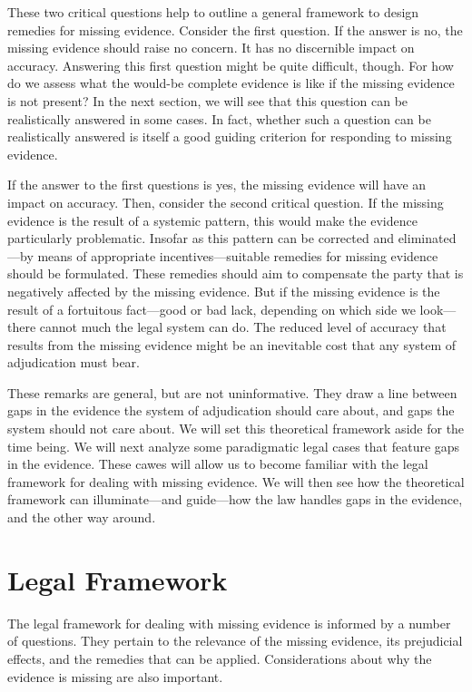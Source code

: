 \documentclass[
  10pt,
  dvipsnames,enabledeprecatedfontcommands]{scrartcl}
\begin{document}
These two critical questions help to outline a general framework to
design remedies for missing evidence. Consider the first question. If
the answer is no, the missing evidence should raise no concern. It has
no discernible impact on accuracy. Answering this first question might
be quite difficult, though. For how do we assess what the would-be
complete evidence is like if the missing evidence is not present? In the
next section, we will see that this question can be realistically
answered in some cases. In fact, whether such a question can be
realistically answered is itself a good guiding criterion for responding
to missing evidence.

If the answer to the first questions is yes, the missing evidence will
have an impact on accuracy. Then, consider the second critical question.
If the missing evidence is the result of a systemic pattern, this would
make the evidence particularly problematic. Insofar as this pattern can
be corrected and eliminated---by means of appropriate
incentives---suitable remedies for missing evidence should be
formulated. These remedies should aim to compensate the party that is
negatively affected by the missing evidence. But if the missing evidence
is the result of a fortuitous fact---good or bad lack, depending on
which side we look---there cannot much the legal system can do. The
reduced level of accuracy that results from the missing evidence might
be an inevitable cost that any system of adjudication must bear.

These remarks are general, but are not uninformative. They draw a line
between gaps in the evidence the system of adjudication should care
about, and gaps the system should not care about. We will set this
theoretical framework aside for the time being. We will next analyze
some paradigmatic legal cases that feature gaps in the evidence. These
cawes will allow us to become familiar with the legal framework for
dealing with missing evidence. We will then see how the theoretical
framework can illuminate---and guide---how the law handles gaps in the
evidence, and the other way around.

\hypertarget{legal-framework}{%
\section{Legal Framework}\label{legal-framework}}

The legal framework for dealing with missing evidence is informed by a
number of questions. They pertain to the relevance of the missing
evidence, its prejudicial effects, and the remedies that can be applied.
Considerations about why the evidence is missing are also important.
\end{document}
